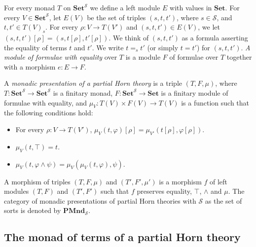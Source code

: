 \documentclass[reqno]{amsart}
\theoremstyle{definition}
\theoremstyle{remark}
\newcommand{\cat}[1]{\mathbf{#1}}
\newcommand{\Set}{\cat{Set}}
\newcommand{\PMnd}{\cat{PMnd}}
\numberwithin{figure}{section}
\begin{document}
For every monad $T$ on $\Set^\mathcal{S}$ we define a left module $E$ with values in $\Set$.
For every $V \in \Set^\mathcal{S}$, let $E(V)$ be the set of triples $(s,t,t')$, where $s \in \mathcal{S}$, and $t,t' \in T(V)_s$.
For every $\rho : V \to T(V')$ and $(s,t,t') \in E(V)$, we let $(s,t,t')[\rho] = (s,t[\rho],t'[\rho])$.
We think of $(s,t,t')$ as a formula asserting the equality of terms $t$ and $t'$.
We write $t =_s t'$ (or simply $t = t'$) for $(s,t,t')$.
\emph{A module of formulae with equality} over $T$ is a module $F$ of formulae over $T$ together with a morphism $e : E \to F$.

\begin{defn}
A \emph{monadic presentation of a partial Horn theory} is a triple $(T,F,\mu)$, where $T : \Set^\mathcal{S} \to \Set^\mathcal{S}$ is a finitary monad,
    $F : \Set^\mathcal{S} \to \Set$ is a finitary module of formulae with equality, and
    $\mu_V : T(V) \times F(V) \to T(V)$ is a function such that the following conditions hold:
\begin{itemize}
\item For every $\rho : V \to T(V')$, $\mu_V(t,\varphi)[\rho] = \mu_{V'}(t[\rho],\varphi[\rho])$.
\item $\mu_V(t, \top) = t$.
\item $\mu_V(t, \varphi \land \psi) = \mu_V(\mu_V(t, \varphi), \psi)$.
\end{itemize}
A morphism of triples $(T,F,\mu)$ and $(T',F',\mu')$ is a morphism $f$ of left modules $(T,F)$ and $(T',F')$ such that $f$ preserves equality, $\top$, $\land$ and $\mu$.
The category of monadic presentations of partial Horn theories with $\mathcal{S}$ as the set of sorts is denoted by $\PMnd_\mathcal{S}$.
\end{defn}

\subsection{The monad of terms of a partial Horn theory}
\end{document}
